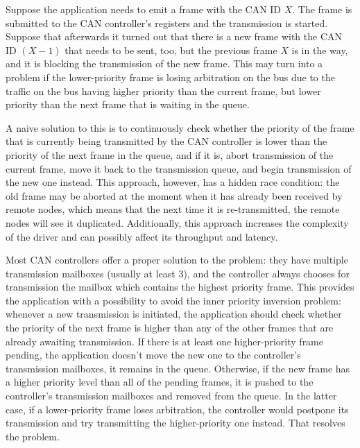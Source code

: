 \begin{remark}[breakable]
    Suppose the application needs to emit a frame with the CAN ID $X$.
    The frame is submitted to the CAN controller's registers and the transmission is started.
    Suppose that afterwards it turned out that there is a new frame with the CAN ID $(X-1)$ that needs to be sent,
    too, but the previous frame $X$ is in the way, and it is blocking the transmission of the new frame.
    This may turn into a problem if the lower-priority frame is losing arbitration on the bus due
    to the traffic on the bus having higher priority than the current frame,
    but lower priority than the next frame that is waiting in the queue.

    A naive solution to this is to continuously check whether the priority of the frame that is currently being
    transmitted by the CAN controller is lower than the priority of the next frame in the queue, and if it is,
    abort transmission of the current frame, move it back to the transmission queue,
    and begin transmission of the new one instead.
    This approach, however, has a hidden race condition:
    the old frame may be aborted at the moment when it has already been received by remote nodes,
    which means that the next time it is re-transmitted, the remote nodes will see it duplicated.
    Additionally, this approach increases the complexity of the driver and can possibly affect
    its throughput and latency.

    Most CAN controllers offer a proper solution to the problem:
    they have multiple transmission mailboxes (usually at least 3),
    and the controller always chooses for transmission the mailbox which contains the highest priority frame.
    This provides the application with a possibility to avoid the inner priority inversion problem:
    whenever a new transmission is initiated, the application should check whether the priority of the next frame
    is higher than any of the other frames that are already awaiting transmission.
    If there is at least one higher-priority frame pending,
    the application doesn't move the new one to the controller's transmission mailboxes,
    it remains in the queue.
    Otherwise, if the new frame has a higher priority level than all of the pending frames,
    it is pushed to the controller's transmission mailboxes and removed from the queue.
    In the latter case, if a lower-priority frame loses arbitration,
    the controller would postpone its transmission and try transmitting the higher-priority one instead.
    That resolves the problem.


\end{remark}
